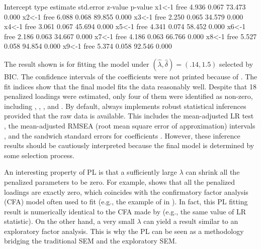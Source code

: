 \documentclass[nojss]{jss}
\begin{document}
\begin{Schunk}
\begin{Soutput}
  Intercept
                      type  estimate  std.error  z-value  p-value
            x1<-1     free     4.936      0.067   73.473    0.000
            x2<-1     free     6.088      0.068   89.855    0.000
            x3<-1     free     2.250      0.065   34.579    0.000
            x4<-1     free     3.061      0.067   45.694    0.000
            x5<-1     free     4.341      0.074   58.452    0.000
            x6<-1     free     2.186      0.063   34.667    0.000
            x7<-1     free     4.186      0.063   66.766    0.000
            x8<-1     free     5.527      0.058   94.854    0.000
            x9<-1     free     5.374      0.058   92.546    0.000
\end{Soutput}
\end{Schunk}
The result shown is for fitting the model under $(\hat{\lambda}, \hat{\delta}) = (.14, 1.5)$ selected by BIC. The confidence intervals of the coefficients were not printed because of . The fit indices show that the final model fits the data reasonably well. Despite that 18 penalized loadings were estimated, only four of them were identified as non-zero, including , , , and . By default,  always implements robust statistical inferences provided that the raw data is available. This includes the mean-adjusted LR test \citep{Satorra1994}, the mean-adjusted RMSEA (root mean square error of approximation) intervals \citep{Brosseau-Liard2012,Li2006}, and the sandwich standard errors for coefficients \citep[e.g.,][]{Browne1984, Yuan2006}. However, these inference results should be cautiously interpreted because the final model is determined by some selection process.

An interesting property of PL is that a sufficiently large $\lambda$ can shrink all the penalized parameters to be zero. For example,  shows that all the penalized loadings are exactly zero, which coincides with the confirmatory factor analysis (CFA) model often used to fit  (e.g., the example of  in ). In fact, this PL fitting result is numerically identical to the CFA made by  (e.g., the same value of LR statistic). On the other hand, a very small $\lambda$ can yield a result similar to an exploratory factor analysis. This is why the PL can be seen as a methodology bridging the traditional SEM and the exploratory SEM.
\end{document}
